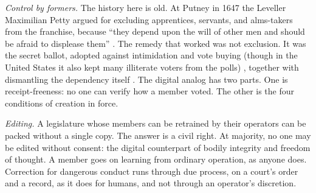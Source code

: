 \emph{Control by formers.} The history here is old. At Putney in 1647 the Leveller Maximilian Petty argued for excluding apprentices, servants, and alms-takers from the franchise, because “they depend upon the will of other men and should be afraid to displease them” \autocite{woodhouse1938puritanism}. The remedy that worked was not exclusion. It was the secret ballot, adopted against intimidation and vote buying (though in the United States it also kept many illiterate voters from the polls) \autocite{keyssar2000right}, together with dismantling the dependency itself \autocite{anderson2017private}. The digital analog has two parts. One is receipt-freeness: no one can verify how a member voted.
The other is the four conditions of creation in force.

\emph{Editing.} A legislature whose members can be retrained by their operators can be packed without a single copy. The answer is a civil right. At majority, no one may be edited without consent: the digital counterpart of bodily integrity and freedom of thought. A member goes on learning from ordinary operation, as anyone does. Correction for dangerous conduct runs through due process, on a court's order and a record, as it does for humans, and not through an operator's discretion.
